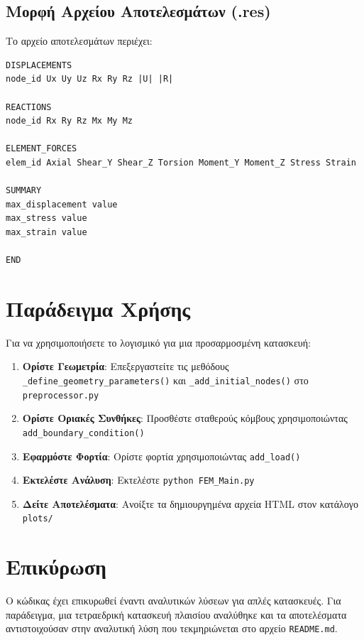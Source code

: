 \documentclass[12pt,a4paper]{article}
\begin{document}
\subsection{Μορφή Αρχείου Αποτελεσμάτων (.res)}

Το αρχείο αποτελεσμάτων περιέχει:

\begin{verbatim}
DISPLACEMENTS
node_id Ux Uy Uz Rx Ry Rz |U| |R|

REACTIONS
node_id Rx Ry Rz Mx My Mz

ELEMENT_FORCES
elem_id Axial Shear_Y Shear_Z Torsion Moment_Y Moment_Z Stress Strain

SUMMARY
max_displacement value
max_stress value
max_strain value

END
\end{verbatim}

\section{Παράδειγμα Χρήσης}

Για να χρησιμοποιήσετε το λογισμικό για μια προσαρμοσμένη κατασκευή:

\begin{enumerate}
    \item \textbf{Ορίστε Γεωμετρία}: Επεξεργαστείτε τις μεθόδους \texttt{\_define\_geometry\_parameters()} και \texttt{\_add\_initial\_nodes()} στο \texttt{preprocessor.py}
    
    \item \textbf{Ορίστε Οριακές Συνθήκες}: Προσθέστε σταθερούς κόμβους χρησιμοποιώντας \texttt{add\_boundary\_condition()}
    
    \item \textbf{Εφαρμόστε Φορτία}: Ορίστε φορτία χρησιμοποιώντας \texttt{add\_load()}
    
    \item \textbf{Εκτελέστε Ανάλυση}: Εκτελέστε \texttt{python FEM\_Main.py}
    
    \item \textbf{Δείτε Αποτελέσματα}: Ανοίξτε τα δημιουργημένα αρχεία HTML στον κατάλογο \texttt{plots/}
\end{enumerate}

\section{Επικύρωση}

Ο κώδικας έχει επικυρωθεί έναντι αναλυτικών λύσεων για απλές κατασκευές. Για παράδειγμα, μια τετραεδρική κατασκευή πλαισίου αναλύθηκε και τα αποτελέσματα αντιστοιχούσαν στην αναλυτική λύση που τεκμηριώνεται στο αρχείο \texttt{README.md}.
\end{document}
